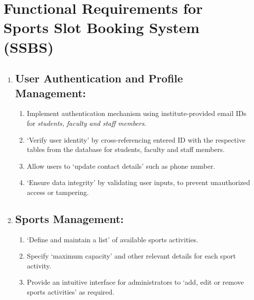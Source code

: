 \documentclass[12pt]{article}
\begin{document}
\vspace{0.4cm}

\section{Functional Requirements for Sports Slot Booking System (SSBS)}

\begin{enumerate}
    
    \item[] \subsection{User Authentication and Profile Management:}
    \begin{enumerate}[label=\alph*)]
        \item Implement authentication mechanism using institute-provided email IDs for \textit{students, faculty and staff members}.
        \item `Verify user identity' by cross-referencing entered ID with the respective tables from the database for students, faculty and staff members.
        \item Allow users to `update contact details' such as phone number.
        \item `Ensure data integrity' by validating user inputs, to prevent unauthorized access or tampering.
    \end{enumerate}

    \vspace{0.4cm}

    \item[] \subsection{Sports Management:}
    \begin{enumerate}[label=\alph*)]
        \item `Define and maintain a list' of available sports activities.
        \item Specify `maximum capacity' and other relevant details for each sport activity.
        \item Provide an intuitive interface for administrators to `add, edit or remove sports activities' as required.
    \end{enumerate}

    \vspace{0.4cm}


\end{enumerate}
\end{document}
